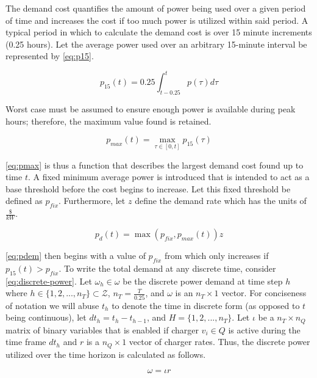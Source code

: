 \documentclass[11pt,a4paper,final]{article}
\newcommand{\Qset}{Q}                       %
\newcommand{\Hset}{H}                       %
\begin{document}
The demand cost quantifies the amount of power being used over a given period of time and increases the cost if too much
power is utilized within said period. A typical period in which to calculate the demand cost is over 15 minute
increments (0.25 hours). Let the average power used over an arbitrary 15-minute interval be represented by \ref{eq:p15}.

\begin{equation}
\label{eq:p15}
p_{15}(t) = 0.25 \int_{t-0.25}^{t} p(\tau) d\tau
\end{equation}

Worst case must be assumed to ensure enough power is available during peak hours; therefore, the maximum value found is
retained.

\begin{equation}
\label{eq:pmax}
p_{max}(t) = \max\limits_{\tau \in [0,t]}p_{15}(\tau)
\end{equation}

\ref{eq:pmax} is thus a function that describes the largest demand cost found up to time \(t\). A fixed minimum average power is
introduced that is intended to act as a base threshold before the cost begins to increase. Let this fixed threshold be
defined as \(p_{fix}\). Furthermore, let \(z\) define the demand rate which has the units of \(\frac{\$}{kW}\).

\begin{equation}
\label{eq:pdem}
p_d(t) = \max(p_{fix},p_{max}(t))z
\end{equation}

\ref{eq:pdem} then begins with a value of \(p_{fix}\) from which only increases if \(p_{15}(t) > p_{fix}\). To write the total
demand at any discrete time, consider \ref{eq:discrete-power}. Let \(\omega_h \in \omega\) be the discrete power demand at time step \(h\)
where \(h \in \{ 1, 2, ..., n_T \} \subset \mathcal{Z}\), \(n_T = \frac{T}{0.25}\), and \(\omega\) is an \(n_T \times 1\) vector. For conciseness of
notation we will abuse \(t_h\) to denote the time in discrete form (as opposed to \(t\) being continuous), let \(dt_h = t_h -
t_{h-1}\), and \(\Hset = \{ 1, 2, ..., n_T \}\). Let \(\iota\) be a \(n_T \times n_Q\) matrix of binary variables that is enabled if
charger \(v_i \in \Qset\) is active during the time frame \(dt_h\) and \(r\) is a \(n_Q \times 1\) vector of charger rates. Thus, the
discrete power utilized over the time horizon is calculated as follows.

\begin{equation}
\label{eq:discrete-power}
  \omega = \iota r
\end{equation}
\end{document}
